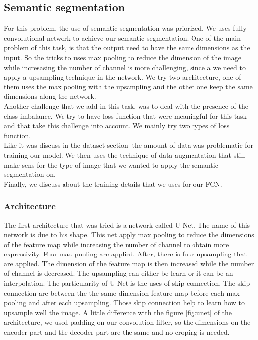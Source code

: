 \subsection{Semantic segmentation}
For this problem, the use of semantic segmentation was priorized. We uses fully convolutional network to achieve our semantic segmentation. One of the main problem of this task, is that the output need to have the same dimensions as the input. So the tricks to uses max pooling to reduce the dimension of the image while incresasing the number of channel is more challenging, since a we need to apply a upsampling technique in the network. We try two architecture, one of them uses the max pooling with the upsampling and the other one keep the same dimensions along the network. 
\\
Another challenge that we add in this task, was to deal with the presence of the class imbalance. We try to have loss function that were meaningful for this task and that take this challenge into account. We mainly try two types of loss function.
\\
Like it was discuss in the dataset section, the amount of data was problematic for training our model. We then uses the technique of data augmentation that still make sens for the type of image that we wanted to apply the semantic segmentation on.
\\
Finally, we discuss about the training details that we uses for our FCN.

\subsubsection{Architecture}
The first architecture that was tried is a network called U-Net. The name of this network is due to his shape. This net apply max pooling to reduce the dimensions of the feature map while increasing the number of channel to obtain more expressivity. Four max pooling are applied. After, there is four upsampling that are applied. The dimension of the feature map is then increased while the number of channel is decreased. The upsampling can either be learn or it can be an interpolation. The particularity of U-Net is the uses of skip connection. The skip connection are between the the same dimension feature map before each max pooling and after each upsampling. Those skip connection help to learn how to upsample well the image. A little difference with the figure \ref{fig:unet} of the architecture, we used padding on our convolution filter, so the dimensions on the encoder part and the decoder part are the same and no croping is needed. \\


